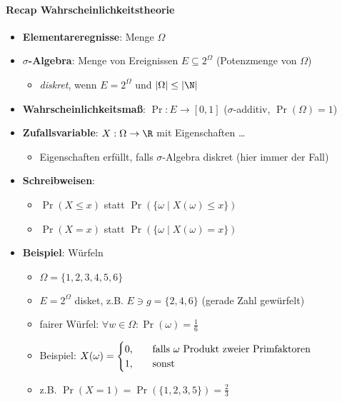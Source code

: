 \paragraph{Recap Wahrscheinlichkeitstheorie}
\begin{itemize}
  \item \textbf{Elementareregnisse}: Menge $ \Omega $
  \item \textbf{$ \sigma $-Algebra}: Menge von Ereignissen $ E \subseteq 2^\Omega $ (Potenzmenge von $ \Omega $)
  \begin{itemize}
    \item \emph{diskret}, wenn $ E = 2^\Omega $ und $ \vert \Omega \vert \leq \vert \N \vert $
  \end{itemize}
  \item \textbf{Wahrscheinlichkeitsmaß}: $ \Pr: E \to [0,1]$ ($ \sigma $-additiv, $ \Pr(\Omega) = 1 $)
  \item \textbf{Zufallsvariable}: $ X : \Omega \to \R $ mit Eigenschaften \dots
  \begin{itemize}
    \item Eigenschaften erfüllt, falls $ \sigma $-Algebra diskret (hier immer der Fall)
  \end{itemize}
  \item \textbf{Schreibweisen}:
  \begin{itemize}
    \item $ \Pr(X \leq x) $ statt $ \Pr(\{ \omega \mid X(\omega) \leq x \}) $
    \item $ \Pr(X = x) $ statt $ \Pr(\{ \omega \mid X(\omega) = x \}) $
  \end{itemize}
  \item \textbf{Beispiel}: Würfeln
  \begin{itemize}
    \item $ \Omega = \{ 1, 2, 3, 4, 5, 6 \} $
    \item $ E = 2^\Omega $ disket, z.B. $ E \ni g = \{ 2, 4, 6 \} $ (gerade Zahl gewürfelt)
    \item fairer Würfel: $ \forall w \in \Omega : \Pr(\omega) = \frac{1}{6} $
    \item Beispiel: $ X(\omega) = \begin{cases}
      0\text{,} \quad &\text{falls $ \omega $ Produkt zweier Primfaktoren} \\
      1\text{,} \quad &\text{sonst}
    \end{cases} $
    \item z.B. $ \Pr(X = 1) = \Pr(\{ 1, 2, 3, 5 \}) = \frac{2}{3} $
  \end{itemize}

\end{itemize}
